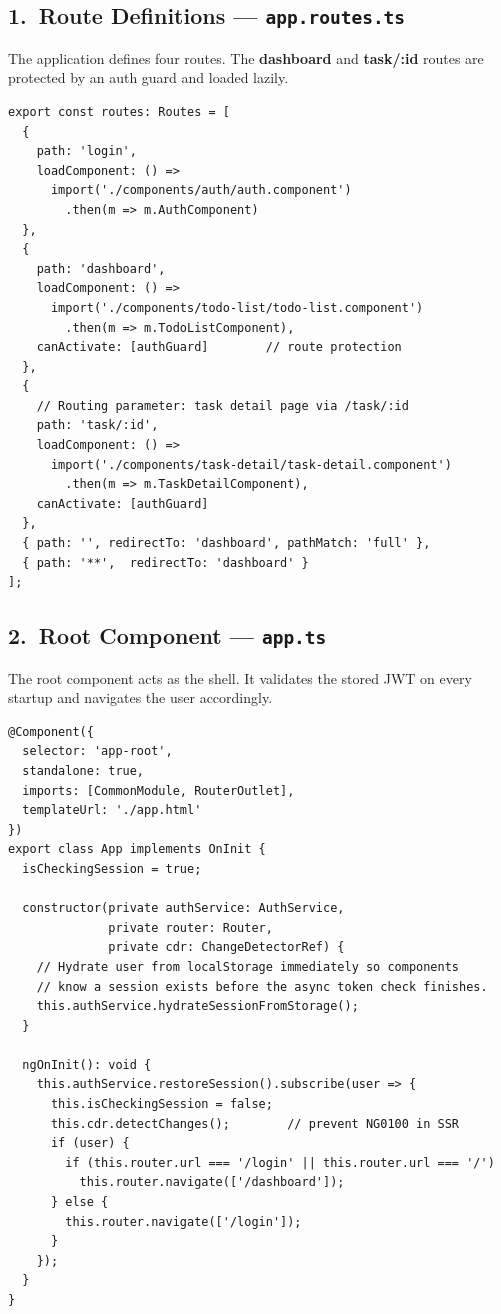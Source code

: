 \documentclass[11pt,a4paper]{article}
\begin{document}
\subsection*{1.\ Route Definitions — \texttt{app.routes.ts}}

The application defines four routes.  The \textbf{dashboard} and \textbf{task/:id} routes are
protected by an auth guard and loaded lazily.

\begin{lstlisting}[style=ts, language={[Sharp]C}]
export const routes: Routes = [
  {
    path: 'login',
    loadComponent: () =>
      import('./components/auth/auth.component')
        .then(m => m.AuthComponent)
  },
  {
    path: 'dashboard',
    loadComponent: () =>
      import('./components/todo-list/todo-list.component')
        .then(m => m.TodoListComponent),
    canActivate: [authGuard]        // route protection
  },
  {
    // Routing parameter: task detail page via /task/:id
    path: 'task/:id',
    loadComponent: () =>
      import('./components/task-detail/task-detail.component')
        .then(m => m.TaskDetailComponent),
    canActivate: [authGuard]
  },
  { path: '', redirectTo: 'dashboard', pathMatch: 'full' },
  { path: '**',  redirectTo: 'dashboard' }
];
\end{lstlisting}

\subsection*{2.\ Root Component — \texttt{app.ts}}

The root component acts as the shell.  It validates the stored JWT on every startup and
navigates the user accordingly.

\begin{lstlisting}[style=ts, language={[Sharp]C}]
@Component({
  selector: 'app-root',
  standalone: true,
  imports: [CommonModule, RouterOutlet],
  templateUrl: './app.html'
})
export class App implements OnInit {
  isCheckingSession = true;

  constructor(private authService: AuthService,
              private router: Router,
              private cdr: ChangeDetectorRef) {
    // Hydrate user from localStorage immediately so components
    // know a session exists before the async token check finishes.
    this.authService.hydrateSessionFromStorage();
  }

  ngOnInit(): void {
    this.authService.restoreSession().subscribe(user => {
      this.isCheckingSession = false;
      this.cdr.detectChanges();        // prevent NG0100 in SSR
      if (user) {
        if (this.router.url === '/login' || this.router.url === '/')
          this.router.navigate(['/dashboard']);
      } else {
        this.router.navigate(['/login']);
      }
    });
  }
}
\end{lstlisting}
\end{document}
